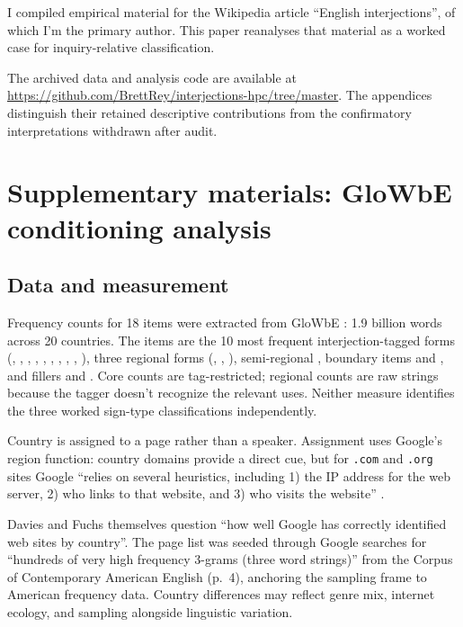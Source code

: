 \documentclass[12pt]{article}
\begin{document}
I compiled empirical material for the Wikipedia article \enquote{English
interjections}, of which I'm the primary author. This paper reanalyses
that material as a worked case for inquiry-relative classification.

The archived data and analysis code are available at
\url{https://github.com/BrettRey/interjections-hpc/tree/master}.
The appendices distinguish their retained descriptive contributions
from the confirmatory interpretations withdrawn after audit.
\fi

\clearpage
\begingroup
\setlength{\emergencystretch}{3em}
\printbibliography
\endgroup

\clearpage

\appendix

\section[Supplementary materials]{Supplementary materials: GloWbE conditioning analysis}
\label{app:conditioning}

\subsection{Data and measurement}

Frequency counts for 18 items were extracted from GloWbE \citep{daviesfuchs2015}: 1.9 billion words across 20 countries. The items are the 10 most frequent interjection-tagged forms (, , , , , , , , , ), three regional forms (, , ), semi-regional , boundary items  and , and fillers  and . Core counts are tag-restricted; regional counts are raw strings because the tagger doesn't recognize the relevant uses. Neither measure identifies the three worked sign-type classifications independently.

Country is assigned to a page rather than a speaker. Assignment uses Google's region function: country domains provide a direct cue, but for \texttt{.com} and \texttt{.org} sites Google \enquote{relies on several heuristics, including 1) the IP address for the web server, 2) who links to that website, and 3) who visits the website} \citep[4]{daviesfuchs2015}. 

Davies and Fuchs themselves question \enquote{how well Google has correctly identified web sites by country}. The page list was seeded through Google searches for \enquote{hundreds of very high frequency 3-grams (three word strings)} from the Corpus of Contemporary American English (p.~4), anchoring the sampling frame to American frequency data. Country differences may reflect genre mix, internet ecology, and sampling alongside linguistic variation.
\end{document}
